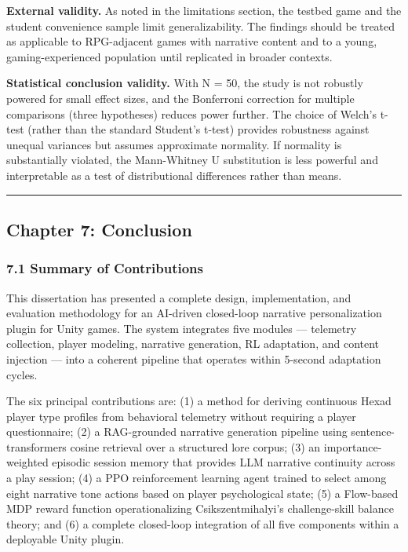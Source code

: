 \textbf{External validity.} As noted in the limitations section, the
testbed game and the student convenience sample limit generalizability.
The findings should be treated as applicable to RPG-adjacent games with
narrative content and to a young, gaming-experienced population until
replicated in broader contexts.

\textbf{Statistical conclusion validity.} With N = 50, the study is not
robustly powered for small effect sizes, and the Bonferroni correction
for multiple comparisons (three hypotheses) reduces power further. The
choice of Welch's t-test (rather than the standard Student's t-test)
provides robustness against unequal variances but assumes approximate
normality. If normality is substantially violated, the Mann-Whitney U
substitution is less powerful and interpretable as a test of
distributional differences rather than means.

\begin{center}\rule{0.5\linewidth}{0.5pt}\end{center}

\subsection{Chapter 7: Conclusion}\label{chapter-7-conclusion}

\subsubsection{7.1 Summary of
Contributions}\label{summary-of-contributions}

This dissertation has presented a complete design, implementation, and
evaluation methodology for an AI-driven closed-loop narrative
personalization plugin for Unity games. The system integrates five
modules --- telemetry collection, player modeling, narrative generation,
RL adaptation, and content injection --- into a coherent pipeline that
operates within 5-second adaptation cycles.

The six principal contributions are: (1) a method for deriving
continuous Hexad player type profiles from behavioral telemetry without
requiring a player questionnaire; (2) a RAG-grounded narrative
generation pipeline using sentence-transformers cosine retrieval over a
structured lore corpus; (3) an importance-weighted episodic session
memory that provides LLM narrative continuity across a play session; (4)
a PPO reinforcement learning agent trained to select among eight
narrative tone actions based on player psychological state; (5) a
Flow-based MDP reward function operationalizing Csikszentmihalyi's
challenge-skill balance theory; and (6) a complete closed-loop
integration of all five components within a deployable Unity plugin.

